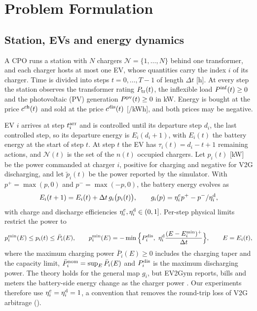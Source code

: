 \section{Problem Formulation}\label{sec:problem}

\subsection{Station, EVs and energy dynamics}\label{sec:station}

A CPO runs a station with $N$ chargers $\mathcal N=\{1,\dots,N\}$ behind one transformer, and each charger hosts at most one EV, whose quantities carry the index $i$ of its charger.
Time is divided into steps $t=0,\dots,T-1$ of length $\Delta t$ [h].
At every step the station observes the transformer rating $P_{\mathrm{tr}}(t)$, the inflexible load $P^{\mathrm{inf}}(t)\ge0$ and the photovoltaic (PV) generation $P^{\mathrm{pv}}(t)\ge0$ in kW.
Energy is bought at the price $c^{\mathrm{ch}}(t)$ and sold at the price $c^{\mathrm{dis}}(t)$ [\texteuro/kWh], and both prices may be negative.

EV $i$ arrives at step $t_i^{\mathrm{arr}}$ and is controlled until its departure step $d_i$, the last controlled step, so its departure energy is $E_i(d_i+1)$, with $E_i(t)$ the battery energy at the start of step $t$.
At step $t$ the EV has $\tau_i(t)=d_i-t+1$ remaining actions, and $\mathcal N(t)$ is the set of the $n(t)$ occupied chargers.
Let $p_i(t)$ [kW] be the power commanded at charger $i$, positive for charging and negative for V2G discharging, and let $\tilde p_i(t)$ be the power reported by the simulator.
With $p^{+}=\max(p,0)$ and $p^{-}=\max(-p,0)$, the battery energy evolves as
\begin{equation}\label{eq:dynamics}
E_i(t+1)=E_i(t)+\Delta t\,g_i\big(p_i(t)\big),\qquad g_i(p)=\eta_i^{\mathrm c}p^{+}-p^{-}/\eta_i^{\mathrm d},
\end{equation}
with charge and discharge efficiencies $\eta_i^{\mathrm c},\eta_i^{\mathrm d}\in(0,1]$.
Per-step physical limits restrict the power to
\begin{equation}\label{eq:limits}
\pmn_i(E)\le p_i(t)\le \bar P_i(E),\qquad \pmn_i(E)=-\min\Big\{\Pdis_i,\ \eta_i^{\sm d}\frac{(E-E_i^{\min})^{+}}{\Delta t}\Big\},\qquad E=E_i(t),
\end{equation}
where the maximum charging power $\bar P_i(E)\ge0$ includes the charging taper and the capacity limit, $\bar P^{\mathrm{nom}}_i=\sup_E\bar P_i(E)$ and $P^{\mathrm{dis}}_i$ is the maximum discharging power.
The theory holds for the general map $g_i$, but EV2Gym reports, bills and meters the battery-side energy change as the charger power \cite{orfanoudakis2025ev2gym}.
Our experiments therefore use $\eta_i^{\mathrm c}=\eta_i^{\mathrm d}=1$, a convention that removes the round-trip loss of V2G arbitrage ().

